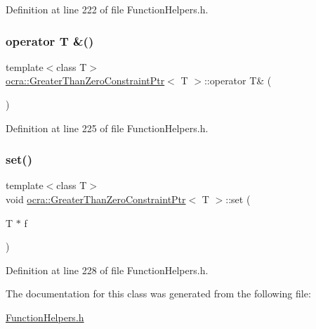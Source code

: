 Definition at line 222 of file Function\+Helpers.\+h.

\hypertarget{classocra_1_1GreaterThanZeroConstraintPtr_a4f84335bff8491be942a23fbf70cc9f8}{}\label{classocra_1_1GreaterThanZeroConstraintPtr_a4f84335bff8491be942a23fbf70cc9f8} 
\subsubsection{\texorpdfstring{operator T \&()}{operator T \&()}}
{\footnotesize\ttfamily template$<$class T$>$ \\
\hyperlink{classocra_1_1GreaterThanZeroConstraintPtr}{ocra\+::\+Greater\+Than\+Zero\+Constraint\+Ptr}$<$ T $>$\+::operator T\& (\begin{DoxyParamCaption}{ }\end{DoxyParamCaption})\hspace{0.3cm}{\ttfamily [inline]}}



Definition at line 225 of file Function\+Helpers.\+h.

\hypertarget{classocra_1_1GreaterThanZeroConstraintPtr_a3c6c6625ab65691ed326a0a17b0d9e27}{}\label{classocra_1_1GreaterThanZeroConstraintPtr_a3c6c6625ab65691ed326a0a17b0d9e27} 
\subsubsection{\texorpdfstring{set()}{set()}}
{\footnotesize\ttfamily template$<$class T$>$ \\
void \hyperlink{classocra_1_1GreaterThanZeroConstraintPtr}{ocra\+::\+Greater\+Than\+Zero\+Constraint\+Ptr}$<$ T $>$\+::set (\begin{DoxyParamCaption}\item[{T $\ast$}]{f }\end{DoxyParamCaption})\hspace{0.3cm}{\ttfamily [inline]}}



Definition at line 228 of file Function\+Helpers.\+h.



The documentation for this class was generated from the following file\+:\begin{DoxyCompactItemize}
\item 
\hyperlink{FunctionHelpers_8h}{Function\+Helpers.\+h}\end{DoxyCompactItemize}
